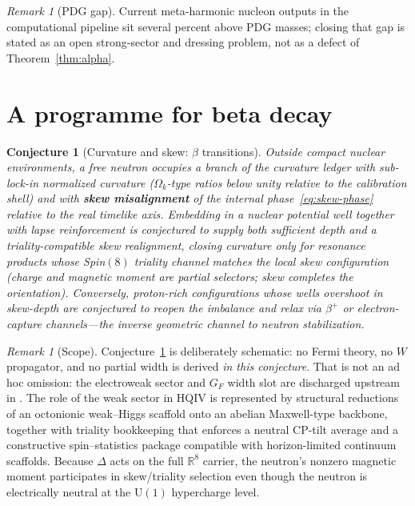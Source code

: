 \documentclass[11pt,a4paper]{article}
\theoremstyle{plain}
\theoremstyle{definition}
\theoremstyle{remark}
\newtheorem{remark}[theorem]{Remark}
\theoremstyle{plain}
\newtheorem{conjecture}[theorem]{Conjecture}
\theoremstyle{definition}
\begin{document}
\begin{remark}[PDG gap]
Current meta-harmonic nucleon outputs in the computational pipeline sit several percent above PDG masses; closing that gap is stated as an open strong-sector and dressing problem, not as a defect of Theorem~\ref{thm:alpha}.
\end{remark}

\section{A programme for beta decay}

\begin{conjecture}[Curvature and skew: $\beta$ transitions]\label{conj:beta}
Outside compact nuclear environments, a free neutron occupies a branch of the curvature ledger with sub-lock-in normalized curvature ($\Omega_k$-type ratios below unity relative to the calibration shell) and with \textbf{skew misalignment} of the internal phase~\eqref{eq:skew-phase} relative to the real timelike axis.
Embedding in a nuclear potential well together with lapse reinforcement is conjectured to supply both sufficient \emph{depth} and a triality-compatible \emph{skew realignment}, closing curvature only for resonance products whose Spin$(8)$ triality channel matches the local skew configuration (charge and magnetic moment are partial selectors; skew completes the orientation).
Conversely, proton-rich configurations whose wells \emph{overshoot} in skew-depth are conjectured to reopen the imbalance and relax via $\beta^{+}$ or electron-capture channels---the inverse geometric channel to neutron stabilization.
\end{conjecture}

\begin{remark}[Scope]
Conjecture~\ref{conj:beta} is deliberately schematic: no Fermi theory, no $W$ propagator,
and no partial width is derived \emph{in this conjecture}. That is not an ad hoc omission:
the electroweak sector and $G_F$ width slot are discharged upstream in
\cite{hqiv-tuft-sm-lagrangian-paper}. The role of the weak sector in HQIV is represented
by structural reductions of an octonionic weak--Higgs scaffold onto an abelian
Maxwell-type backbone, together with triality bookkeeping that enforces a neutral
CP-tilt average and a constructive spin--statistics package compatible with
horizon-limited continuum scaffolds.
Because $\Delta$ acts on the full $\mathbb{R}^8$ carrier, the neutron's nonzero magnetic moment participates in skew/triality selection even though the neutron is electrically neutral at the $\mathrm{U}(1)$ hypercharge level.
\end{remark}
\end{document}
